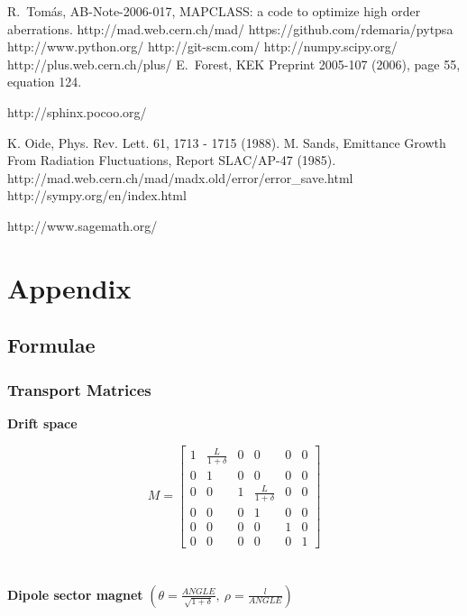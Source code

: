 \documentclass[a4paper]{cernatsnote}
\begin{document}
\begin{thebibliography}{9}   %

 R.~Tom\'as, AB-Note-2006-017, MAPCLASS: a code to
  optimize high order aberrations.
%
 http://mad.web.cern.ch/mad/
%
 https://github.com/rdemaria/pytpsa
%
 http://www.python.org/
%
 http://git-scm.com/
%
 http://numpy.scipy.org/
%
 http://plus.web.cern.ch/plus/
%
%
 E.~Forest, KEK Preprint 2005-107 (2006), page 55,
  equation 124.
%

 http://sphinx.pocoo.org/
%

 K. Oide, Phys. Rev. Lett. 61, 1713 - 1715 (1988).
%
 M. Sands, Emittance Growth From Radiation
  Fluctuations, Report SLAC/AP-47 (1985).
%
 http://mad.web.cern.ch/mad/madx.old/error/error\_save.html
%
  http://sympy.org/en/index.html

  http://www.sagemath.org/

\end{thebibliography}

\clearpage
\appendix
\section{Appendix}

\subsection{Formulae}
\subsubsection{Transport Matrices}
\label{ap:trans1}
\textbf{Drift space}

\[
M
=
\begin{bmatrix}
1 & \frac{L}{1+\delta} & 0 & 0 & 0 & 0 \\[0.3em]
0 & 1 & 0 & 0 & 0 & 0 \\[0.3em]
0 & 0 & 1 & \frac{L}{1+\delta} & 0 & 0 \\[0.3em]
0 & 0 & 0 & 1 & 0 & 0 \\[0.3em]
0 & 0 & 0 & 0 & 1 & 0 \\[0.3em]
0 & 0 & 0 & 0 & 0 & 1
\end{bmatrix}
\]
\\\\
\textbf{Dipole sector magnet} $(\theta = \frac{ANGLE}{\sqrt{1+\delta}},\:
\rho = \frac{l}{ANGLE})$
\end{document}
